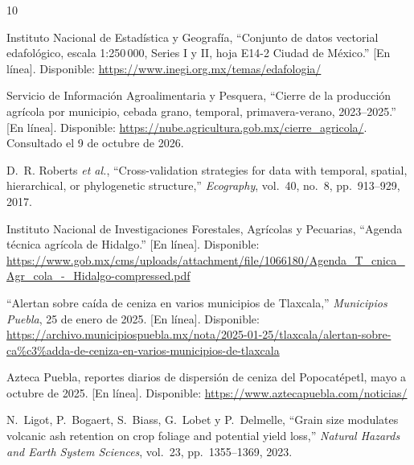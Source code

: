 \begin{thebibliography}{10}

Instituto Nacional de Estadística y Geografía, ``Conjunto de datos vectorial edafológico, escala 1:250\,000, Series I
y II, hoja E14-2 Ciudad de México.'' [En línea]. Disponible: \url{https://www.inegi.org.mx/temas/edafologia/}

Servicio de Información Agroalimentaria y Pesquera, ``Cierre de la producción agrícola por municipio, cebada grano,
temporal, primavera-verano, 2023--2025.'' [En línea]. Disponible: \url{https://nube.agricultura.gob.mx/cierre_agricola/}.
Consultado el 9 de octubre de 2026.

D.~R. Roberts \emph{et al.}, ``Cross-validation strategies for data with temporal, spatial, hierarchical, or
phylogenetic structure,'' \emph{Ecography}, vol.~40, no.~8, pp.~913--929, 2017.

Instituto Nacional de Investigaciones Forestales, Agrícolas y Pecuarias, ``Agenda técnica agrícola de Hidalgo.''
[En línea]. Disponible:
\url{https://www.gob.mx/cms/uploads/attachment/file/1066180/Agenda_T_cnica_Agr_cola_-_Hidalgo-compressed.pdf}

``Alertan sobre caída de ceniza en varios municipios de Tlaxcala,'' \emph{Municipios Puebla}, 25 de enero de 2025.
[En línea]. Disponible:
\url{https://archivo.municipiospuebla.mx/nota/2025-01-25/tlaxcala/alertan-sobre-ca%c3%adda-de-ceniza-en-varios-municipios-de-tlaxcala}

Azteca Puebla, reportes diarios de dispersión de ceniza del Popocatépetl, mayo a octubre de 2025. [En línea].
Disponible: \url{https://www.aztecapuebla.com/noticias/}

N.~Ligot, P.~Bogaert, S.~Biass, G.~Lobet y P.~Delmelle, ``Grain size modulates volcanic ash retention on crop foliage
and potential yield loss,'' \emph{Natural Hazards and Earth System Sciences}, vol.~23, pp.~1355--1369, 2023.

\end{thebibliography}
